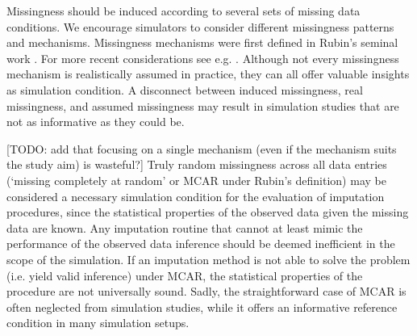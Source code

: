 \documentclass[bimj,fleqn]{w-art}
\begin{document}

Missingness should be induced according to several sets of missing data conditions. We encourage simulators to consider different missingness patterns and mechanisms. Missingness mechanisms were first defined in Rubin's seminal work \citep{rubi76}. For more recent considerations see e.g. \citet{seam13, meal15, dore18, more18, scho18, litt20, moha21, scho21}. Although not every missingness mechanism is realistically assumed in practice, they can all offer valuable insights as simulation condition. A disconnect between induced missingness, real missingness, and assumed missingness may result in simulation studies that are not as informative as they could be.

[TODO: add that focusing on a single mechanism (even if the mechanism suits the study aim) is wasteful?] Truly random missingness across all data entries (`missing completely at random' or MCAR under Rubin's definition) may be considered a necessary simulation condition for the evaluation of imputation procedures, since the statistical properties of the observed data given the missing data are known. Any imputation routine that cannot at least mimic the performance of the observed data inference should be deemed inefficient in the scope of the simulation. If an imputation method is not able to solve the problem (i.e. yield valid inference) under MCAR, the statistical properties of the procedure are not universally sound. Sadly, the straightforward case of MCAR is often neglected from simulation studies, while it offers an informative reference condition in many simulation setups.
\end{document}
